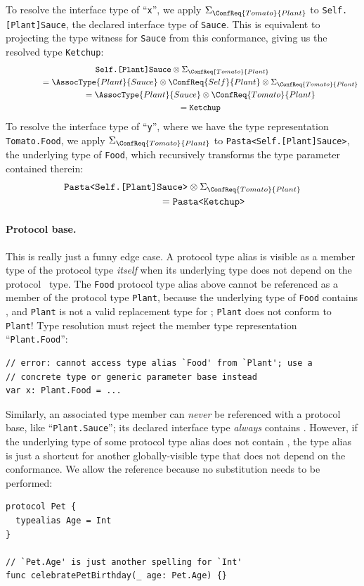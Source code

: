 \documentclass[../generics]{subfiles}
\begin{document}
To resolve the interface type of ``\texttt{x}'', we apply $\Sigma_{\ConfReq{Tomato}{Plant}}$ to \texttt{Self.[Plant]Sauce}, the declared interface type of \texttt{Sauce}. This is equivalent to projecting the type witness for \texttt{Sauce} from this conformance, giving us the resolved type \texttt{Ketchup}:
\begin{gather*}
\texttt{Self.[Plant]Sauce} \otimes \Sigma_{\ConfReq{Tomato}{Plant}}\\
\qquad\qquad {} = \AssocType{Plant}{Sauce} \otimes \ConfReq{Self}{Plant} \otimes \Sigma_{\ConfReq{Tomato}{Plant}}\\
\qquad\qquad {} = \AssocType{Plant}{Sauce} \otimes \ConfReq{Tomato}{Plant}\\
\qquad\qquad {} = \texttt{Ketchup}
\end{gather*}
To resolve the interface type of ``\texttt{y}'', where we have the type representation \texttt{Tomato.Food}, we apply $\Sigma_{\ConfReq{Tomato}{Plant}}$ to \texttt{Pasta<Self.[Plant]Sauce>}, the underlying type of \texttt{Food}, which recursively transforms the type parameter contained therein:
\begin{gather*}
\texttt{Pasta<Self.[Plant]Sauce>} \otimes \Sigma_{\ConfReq{Tomato}{Plant}}\\
\qquad\qquad {} = \texttt{Pasta<Ketchup>}
\end{gather*}

\paragraph{Protocol base.} This is really just a funny edge case. A protocol type alias is visible as a member type of the protocol type \emph{itself} when its underlying type does not depend on the \IndexSelf protocol \tSelf\ type. The \texttt{Food} protocol type alias above cannot be referenced as a member of the protocol type \texttt{Plant}, because the underlying type of \texttt{Food} contains \tSelf, and \texttt{Plant} is not a valid replacement type for \tSelf; \texttt{Plant} does not conform to \texttt{Plant}! Type resolution must reject the member type representation ``\texttt{Plant.Food}'':
\begin{Verbatim}
// error: cannot access type alias `Food' from `Plant'; use a
// concrete type or generic parameter base instead
var x: Plant.Food = ...
\end{Verbatim}
Similarly, an associated type member can \emph{never} be referenced with a protocol base, like ``\texttt{Plant.Sauce}''; its declared interface type \emph{always} contains \tSelf. However, if the underlying type of some protocol type alias does not contain \tSelf, the type alias is just a shortcut for another globally-visible type that does not depend on the conformance. We allow the reference because no substitution needs to be performed:
\begin{Verbatim}
protocol Pet {
  typealias Age = Int
}

// `Pet.Age' is just another spelling for `Int'
func celebratePetBirthday(_ age: Pet.Age) {}
\end{Verbatim}
\end{document}
